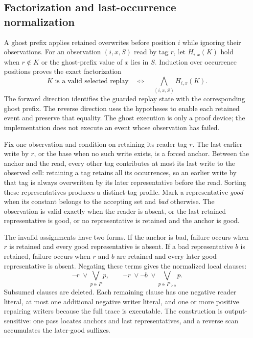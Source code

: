 \subsection{Factorization and last-occurrence normalization}

A ghost prefix applies retained overwrites before position $i$ while ignoring their
observations.  For an observation $(i,x,S)$ read by tag $r$, let
$H_{i,x}(K)$ hold when $r\notin K$ or the ghost-prefix value of $x$ lies in $S$.
Induction over occurrence positions proves the exact factorization
\[
  K\text{ is a valid selected replay}
  \quad\Longleftrightarrow\quad
  \bigwedge_{(i,x,S)} H_{i,x}(K).
\]
The forward direction identifies the guarded replay state with the corresponding
ghost prefix.  The reverse direction uses the hypotheses to enable each retained
event and preserve that equality.  The ghost execution is only a proof device; the
implementation does not execute an event whose observation has failed.

Fix one observation and condition on retaining its reader tag $r$.  The last earlier
write by $r$, or the base when no such write exists, is a forced anchor.  Between the
anchor and the read, every other tag contributes at most its last write to the
observed cell: retaining a tag retains all its occurrences, so an earlier write by
that tag is always overwritten by its later representative before the read.  Sorting
these representatives produces a distinct-tag profile.  Mark a representative
\emph{good} when its constant belongs to the accepting set and \emph{bad} otherwise.
The observation is valid exactly when the reader is absent, or the last retained
representative is good, or no representative is retained and the anchor is good.

The invalid assignments have two forms.  If the anchor is bad, failure occurs when
$r$ is retained and every good representative is absent.  If a bad representative
$b$ is retained, failure occurs when $r$ and $b$ are retained and every later good
representative is absent.  Negating these terms gives the normalized local clauses:
\[
  \neg r\;\lor\!\bigvee_{p\in P}p,
  \qquad
  \neg r\;\lor\neg b\;\lor\!\bigvee_{p\in P_{>b}}p.
\]
Subsumed clauses are deleted.  Each remaining clause has one negative reader
literal, at most one additional negative writer literal, and one or more positive
repairing writers because the full trace is executable.  The construction is
output-sensitive: one pass locates anchors and last representatives, and a reverse
scan accumulates the later-good suffixes.

